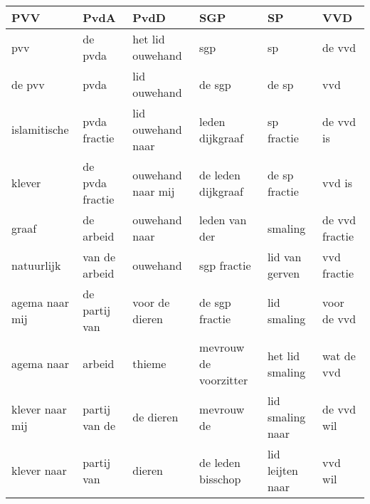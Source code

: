 \begin{tabular}{llllll}
\toprule
             PVV &             PvdA &               PvdD &                    SGP &                SP &             VVD \\
\midrule
             pvv &          de pvda &   het lid ouwehand &                    sgp &                sp &          de vvd \\
          de pvv &             pvda &       lid ouwehand &                 de sgp &             de sp &             vvd \\
    islamitische &     pvda fractie &  lid ouwehand naar &        leden dijkgraaf &        sp fractie &       de vvd is \\
          klever &  de pvda fractie &  ouwehand naar mij &     de leden dijkgraaf &     de sp fractie &          vvd is \\
           graaf &        de arbeid &      ouwehand naar &          leden van der &           smaling &  de vvd fractie \\
      natuurlijk &    van de arbeid &           ouwehand &            sgp fractie &    lid van gerven &     vvd fractie \\
  agema naar mij &    de partij van &     voor de dieren &         de sgp fractie &       lid smaling &     voor de vvd \\
      agema naar &           arbeid &             thieme &  mevrouw de voorzitter &   het lid smaling &      wat de vvd \\
 klever naar mij &    partij van de &          de dieren &             mevrouw de &  lid smaling naar &      de vvd wil \\
     klever naar &       partij van &             dieren &      de leden bisschop &  lid leijten naar &         vvd wil \\
\bottomrule
\end{tabular}
